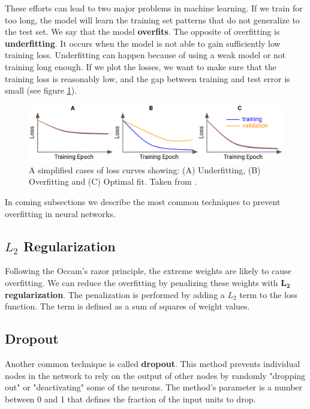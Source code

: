 These efforts can lead to two major problems in machine learning. If we train for too long, the model will learn the training set patterns that do not generalize to the test set. We say that the model \textbf{overfits}. The opposite of overfitting is \textbf{underfitting}. It occurs when the model is not able to gain sufficiently low training loss. Underfitting can happen because of using a weak model or not training long enough. If we plot the losses, we want to make sure that the training loss is reasonably low, and the gap between training and test error is small (see figure \ref{fig:loss_plot}).
 
\begin{figure}[h]
    \centering
    \includegraphics[width=\linewidth]{Sources/Figures/fitting.png}
    \caption{A simplified cases of loss curves \protect\footnotemark showing: (A) Underfitting, (B) Overfitting and (C) Optimal fit. Taken from \cite{bileschi2020deep}.}
    \label{fig:loss_plot}
\end{figure}


In coming subsections we describe the most common techniques to prevent overfitting in neural networks.
\subsection{$L_2$ Regularization}
Following the Occam's razor principle\footnotemark , the extreme weights are likely to cause overfitting. We can reduce the overfitting by penalizing these weights with $\boldsymbol{L_2}$ \textbf{regularization}. The penalization is performed by adding a $L_2$ term to the loss function. The term is defined as a sum of squares of weight values. 



\subsection{Dropout}
Another common technique is called \textbf{dropout}. This method prevents individual nodes in the network to rely on the output of other nodes by randomly "dropping out" or "deactivating" some of the neurons. The method's parameter is a number between 0 and 1 that defines the fraction of the input units to drop.

